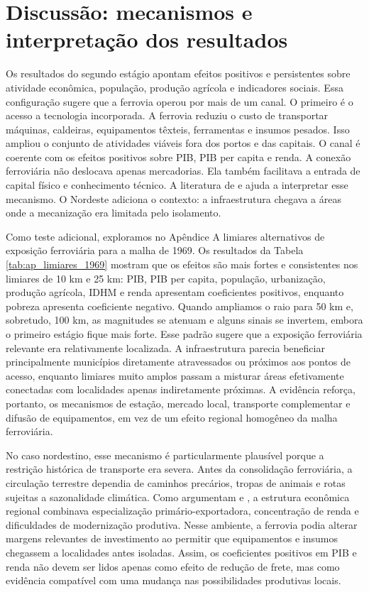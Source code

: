 \documentclass[12pt,a4paper]{article}
\begin{document}
\section{Discussão: mecanismos e interpretação dos resultados}

Os resultados do segundo estágio apontam efeitos positivos e persistentes sobre atividade econômica, população, produção agrícola e indicadores sociais. Essa configuração sugere que a ferrovia operou por mais de um canal. O primeiro é o acesso a tecnologia incorporada. A ferrovia reduziu o custo de transportar máquinas, caldeiras, equipamentos têxteis, ferramentas e insumos pesados. Isso ampliou o conjunto de atividades viáveis fora dos portos e das capitais. O canal é coerente com os efeitos positivos sobre PIB, PIB per capita e renda. A conexão ferroviária não deslocava apenas mercadorias. Ela também facilitava a entrada de capital físico e conhecimento técnico. A literatura de \citet{atack2010} e \citet{hornung2015} ajuda a interpretar esse mecanismo. O Nordeste adiciona o contexto: a infraestrutura chegava a áreas onde a mecanização era limitada pelo isolamento.

Como teste adicional, exploramos no Apêndice A limiares alternativos de exposição ferroviária para a malha de 1969. Os resultados da Tabela \ref{tab:ap_limiares_1969} mostram que os efeitos são mais fortes e consistentes nos limiares de 10 km e 25 km: PIB, PIB per capita, população, urbanização, produção agrícola, IDHM e renda apresentam coeficientes positivos, enquanto pobreza apresenta coeficiente negativo. Quando ampliamos o raio para 50 km e, sobretudo, 100 km, as magnitudes se atenuam e alguns sinais se invertem, embora o primeiro estágio fique mais forte. Esse padrão sugere que a exposição ferroviária relevante era relativamente localizada. A infraestrutura parecia beneficiar principalmente municípios diretamente atravessados ou próximos aos pontos de acesso, enquanto limiares muito amplos passam a misturar áreas efetivamente conectadas com localidades apenas indiretamente próximas. A evidência reforça, portanto, os mecanismos de estação, mercado local, transporte complementar e difusão de equipamentos, em vez de um efeito regional homogêneo da malha ferroviária.

No caso nordestino, esse mecanismo é particularmente plausível porque a restrição histórica de transporte era severa. Antes da consolidação ferroviária, a circulação terrestre dependia de caminhos precários, tropas de animais e rotas sujeitas a sazonalidade climática. Como argumentam \citet{furtado1959} e \citet{eisenberg1974}, a estrutura econômica regional combinava especialização primário-exportadora, concentração de renda e dificuldades de modernização produtiva. Nesse ambiente, a ferrovia podia alterar margens relevantes de investimento ao permitir que equipamentos e insumos chegassem a localidades antes isoladas. Assim, os coeficientes positivos em PIB e renda não devem ser lidos apenas como efeito de redução de frete, mas como evidência compatível com uma mudança nas possibilidades produtivas locais.
\end{document}
